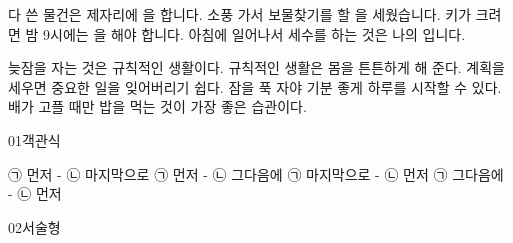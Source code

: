 \documentclass[fs13,seriesSau]{korfarm-base}
\begin{document}


\kfActivityBg \par{}\par\nopagebreak[4]\smallskip\nopagebreak[4]
\begin{kfBlankList}
\kfBlankItem 다 쓴 물건은 제자리에 \kfFillBlank[12mm]{}을 합니다.
\kfBlankItem 소풍 가서 보물찾기를 할 \kfFillBlank[12mm]{}을 세웠습니다.
\kfBlankItem 키가 크려면 밤 9시에는 \kfFillBlank[12mm]{}을 해야 합니다.
\kfBlankItem 아침에 일어나서 세수를 하는 것은 나의 \kfFillBlank[12mm]{}입니다.
\end{kfBlankList}

\kfActivityBg \par{}\par\nopagebreak[4]\smallskip\nopagebreak[4]
\begin{kfOXList}
\kfOXItem 늦잠을 자는 것은 규칙적인 생활이다. \kfFillBlank[12mm]{} \kfOX
\kfOXItem 규칙적인 생활은 몸을 튼튼하게 해 준다. \kfFillBlank[12mm]{} \kfOX
\kfOXItem 계획을 세우면 중요한 일을 잊어버리기 쉽다. \kfFillBlank[12mm]{} \kfOX
\kfOXItem 잠을 푹 자야 기분 좋게 하루를 시작할 수 있다. \kfFillBlank[12mm]{} \kfOX
\kfOXItem 배가 고플 때만 밥을 먹는 것이 가장 좋은 습관이다. \kfFillBlank[12mm]{} \kfOX
\end{kfOXList}


\begin{kfQBlock}{01}{객관식}
\begin{kfChoices}
\kfChoice ㉠ 먼저 - ㉡ 마지막으로
\kfChoice ㉠ 먼저 - ㉡ 그다음에
\kfChoice ㉠ 마지막으로 - ㉡ 먼저
\kfChoice ㉠ 그다음에 - ㉡ 먼저
\end{kfChoices}
\end{kfQBlock}
\begin{kfQBlock}{02}{서술형}
\end{kfQBlock}
\end{document}
